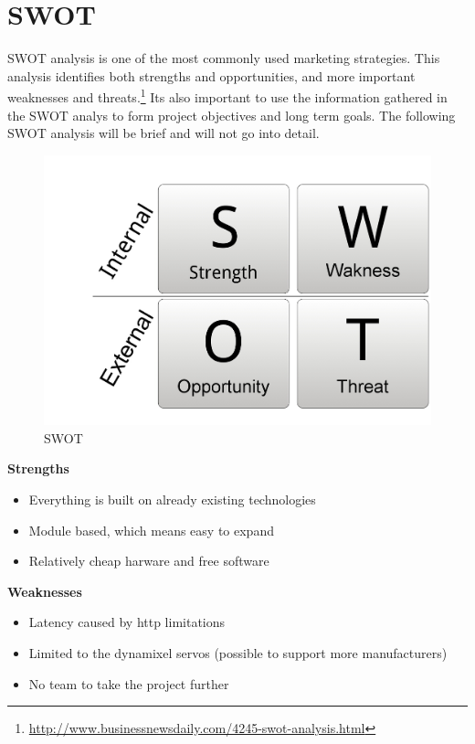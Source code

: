 \chapter{SWOT}
SWOT analysis is one of the most commonly used marketing strategies. 
This analysis identifies both strengths and opportunities, and more important weaknesses and threats.\footnote{\url{http://www.businessnewsdaily.com/4245-swot-analysis.html}}
Its also important to use the information gathered in the SWOT analys to form project objectives and long term goals. 
The following SWOT analysis will be brief and will not go into detail. 
\vspace{\secspace}

\begin{figure}[H]
    \centering
    \includegraphics[width=0.6/textwidth]{graphics/SWOT.jpg}	
    \caption{SWOT}
    \label{fig:swot}
\end{figure}

\textbf{\Large Strengths}
\begin{itemize}
	 \item Everything is built on already existing technologies
	 \item Module based, which means easy to expand
	 \item Relatively cheap harware and free software
\end{itemize}

\textbf{\Large Weaknesses}
\begin{itemize}
	 \item Latency caused by http limitations
	 \item Limited to the dynamixel servos (possible to support more manufacturers)
	 \item No team to take the project further
\end{itemize}

